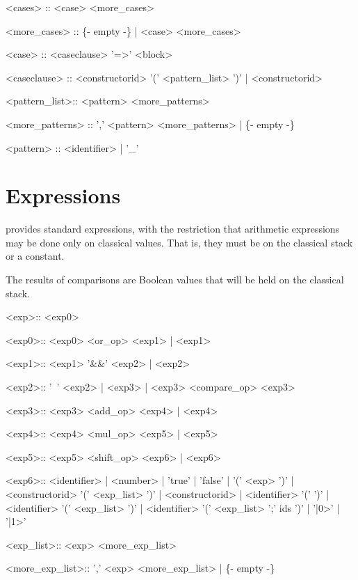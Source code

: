 \begin{singlespace}
\begin{bnf}   
   <cases> :: <case> <more_cases> 
  
   <more_cases> :: \{- empty -\}
        | <case> <more_cases>
  
   <case> :: <caseclause> '=>' <block>
  
   <caseclause> ::  <constructorid> '(' <pattern_list> ')' 
        | <constructorid>
  
   <pattern_list>:: <pattern> <more_patterns>

   <more_patterns> :: ',' <pattern> <more_patterns>
        | \{- empty -\} 

   <pattern> :: <identifier> | '_'
\end{bnf}
\end{singlespace}

\section{Expressions}\label{sec:bnfExpressionDefinition}
\lqpl{} provides  standard expressions, with the restriction that
 arithmetic expressions 
 may be done only on classical values. That is, they must be 
on the classical stack or a constant.

The results of comparisons are Boolean values that will be held on
the classical stack.

\begin{singlespace}
\begin{bnf}   

   <exp>:: <exp0> 
  
   <exp0>:: <exp0> <or_op> <exp1> | <exp1>
  
   <exp1>:: <exp1> '&&' <exp2> | <exp2> 
  
   <exp2>:: '~' <exp2> | <exp3>  | <exp3> <compare_op> <exp3>
  
   <exp3>:: <exp3> <add_op> <exp4> | <exp4>
  
   <exp4>:: <exp4> <mul_op> <exp5> | <exp5> 
  
   <exp5>:: <exp5> <shift_op> <exp6> | <exp6>
  
   <exp6>:: <identifier> | <number> | 'true' | 'false' 
        | '(' <exp> ')' 
        | <constructorid> '(' <exp_list> ')' 
        | <constructorid>
	| <identifier> '('  ')'
        | <identifier> '(' <exp_list> ')'  
        | <identifier> '(' <exp_list> ';' ids ')'
	| '|0>' | '|1>'
  
   <exp_list>:: <exp> <more_exp_list>
  
   <more_exp_list>:: ',' <exp> <more_exp_list>  
        | \{- empty -\} 
\end{bnf}
\end{singlespace}

